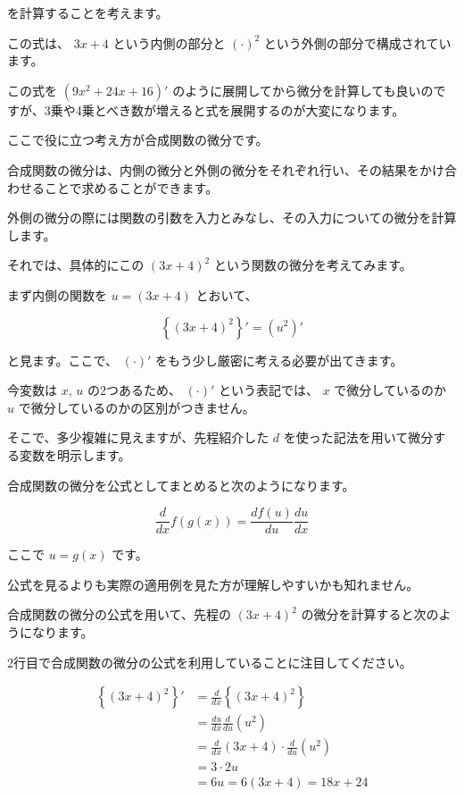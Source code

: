 を計算することを考えます。

この式は、 $3x+4$ という内側の部分と $(\cdot)^{2}$ という外側の部分で構成されています。

この式を $(9x^2 + 24x + 16)'$ のように展開してから微分を計算しても良いのですが、3乗や4乗とべき数が増えると式を展開するのが大変になります。

ここで役に立つ考え方が合成関数の微分です。

合成関数の微分は、内側の微分と外側の微分をそれぞれ行い、その結果をかけ合わせることで求めることができます。

外側の微分の際には関数の引数を入力とみなし、その入力についての微分を計算します。


それでは、具体的にこの $(3x+4)^2$ という関数の微分を考えてみます。

まず内側の関数を $u = (3x+4)$ とおいて、


\[
\left\{ (3x + 4)^{2} \right\}' = (u^{2})'
\]


と見ます。ここで、 $(\cdot)'$ をもう少し厳密に考える必要が出てきます。

今変数は $x$, $u$ の2つあるため、 $(\cdot)'$ という表記では、 $x$ で微分しているのか $u$ で微分しているのかの区別がつきません。

そこで、多少複雑に見えますが、先程紹介した $d$ を使った記法を用いて微分する変数を明示します。


合成関数の微分を公式としてまとめると次のようになります。


\[
\frac{d}{dx} f(g(x)) = \frac{df(u)}{du}\frac{du}{dx}
\]


ここで $u = g(x)$ です。


公式を見るよりも実際の適用例を見た方が理解しやすいかも知れません。

合成関数の微分の公式を用いて、先程の $(3x+4)^2$ の微分を計算すると次のようになります。

2行目で合成関数の微分の公式を利用していることに注目してください。


\[
\begin{aligned}
\left\{ (3x + 4)^{2} \right\}' &= \frac{d}{dx} \left\{ (3x + 4)^{2} \right\} \\
&= \frac{du}{dx} \frac{d}{du} (u^2) \\
&= \frac{d}{dx} (3x + 4) \cdot \frac{d}{du} (u^{2}) \\
&= 3 \cdot 2u   \\
&= 6u = 6(3x + 4) = 18x + 24 \\
\end{aligned}
\]


